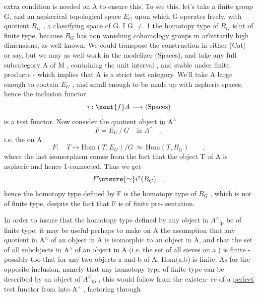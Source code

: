 
extra condition is needed on A to ensure this,  
 To see this, let's
take a finite group G, and an aspherical topological space $E_G$ upon
which G operates freely, with quotient $B_G$ , a classifying space of G.
I G $\neq$ 1\hand{,} the homotopy type of $B_G$ is'nt of finite type, because $B_G$ has
non vanishing cohomology groups in arbitrarily high dimensions, as
well known. We could transpose the  construction in either (Cat) or
\hand{$\Delta^{\wedge}$} say, but we may as well work in the modelizer (Spaces), and take
any  full subcategory A of M , containing the unit interval 
, and stable under finite products - which implies
that A is a strict test category. We'll take A large enough to contain
$E_G$  , and small enough to be made up with aspheric spaces,
hence the inclusion functor
\[ i:\xout{f}A \longrightarrow \text{(Spaces)} \]
is a test functor. Now consider the quotient object \uline{in} A$^{\wedge}$
\[ F = E_G \,/\, G \quad \text{in } A^{\wedge} \quad , \]
i.e. the  on A
\[ F: \quad T \longmapsto \mathrm{Hom}(T,E_G)/G \ \simeq\ \mathrm{Hom}(T,B_G) \qquad , \]
where the last isomorphism comes from the fact that the object T of A
is aspheric and hence 1-connected. Thus we get
\[ F \unsure{\simeq} i^{*}(B_G) \quad , \]
hence the homotopy type  defined by F is the homotopy type of $B_G$ ,
which is not of finite type, despite the fact that F is of finite pre-%
sentation.

In order to insure that the homotopy type defined by any object
in $A^{\wedge}{}_{\mathrm{fp}}$ be of finite type, it may be useful perhaps to make on A the
assumption that any quotient in A$^{\wedge}$ of an object in A is isomorphic to an
object in A, and that the set of all subobjects in A$^{\wedge}$ of an object  in
A (i.e. the set of all sieves on a ) is finite - possibly too that
for any two objects a and b of A, Hom(a,b) is finite. As for the
opposite inclusion, namely that any homotopy type of finite type can
be described by an object of $A^{\wedge}{}_{\mathrm{fp}}$ , this would follow from the existen-%
ce of a \uline{perfect} test functor from \hand{$\Delta$} into A$^{\wedge}$ , factoring through

